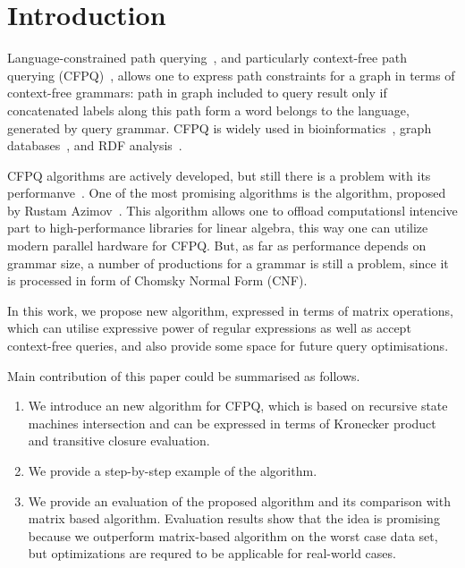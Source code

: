 \section{Introduction}

Language-constrained path querying~\cite{!!!}, and particularly context-free path querying (CFPQ)~\cite{!!!}, allows one to express path constraints for a graph in terms of context-free grammars: path in graph  included to query result only if concatenated labels along this path form a word belongs to the language, generated by query grammar. CFPQ is widely used in bioinformatics~\cite{!!!}, graph databases~\cite{!!!}, and RDF analysis~\cite{!!!}. 

CFPQ algorithms are actively developed, but still there is a problem with its performanve~\cite{!!!}.
One of the most promising algorithms is the algorithm, proposed by Rustam Azimov~\cite{Azimov:2018:CPQ:3210259.3210264}. 
This algorithm allows one to offload computationsl intencive part to high-performance libraries for linear algebra, this way one can utilize modern parallel hardware for CFPQ.
But, as far as performance depends on grammar size, a number of productions for a grammar is still a problem, since it is processed in form of Chomsky Normal Form (CNF). 

In this work, we propose new algorithm, expressed in terms of matrix operations, which can utilise expressive power of regular expressions as well as accept context-free queries, and also provide some space for future query optimisations.

Main contribution of this paper could be summarised as follows.

\begin{enumerate}
\item We introduce an new algorithm for CFPQ, which is based on recursive state machines intersection and can be expressed in terms of Kronecker product and transitive closure evaluation.
\item We provide a step-by-step example of the algorithm.
\item We provide an evaluation of the proposed algorithm and its comparison with matrix based algorithm. Evaluation results show that the idea is promising because we outperform matrix-based algorithm on the worst case data set, but optimizations are requred to be applicable for real-world cases.
\end{enumerate}

